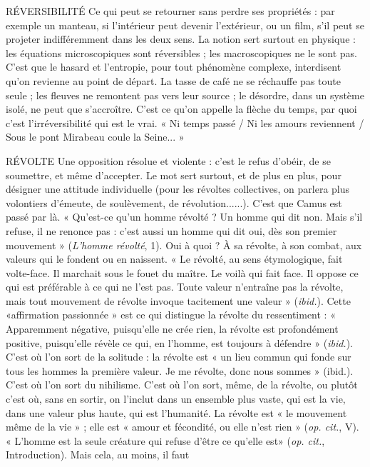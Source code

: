 RÉVERSIBILITÉ Ce qui peut se retourner sans perdre ses propriétés : par
exemple un manteau, si l’intérieur peut devenir l'extérieur,
ou un film, s’il peut se projeter indifféremment dans les deux sens. La notion sert
surtout en physique : les équations microscopiques sont réversibles ; les macroscopiques
ne le sont pas. C’est que le hasard et l’entropie, pour tout phénomène
complexe, interdisent qu’on revienne au point de départ. La tasse de café ne se
réchauffe pas toute seule ; les fleuves ne remontent pas vers leur source ; le
désordre, dans un système isolé, ne peut que s’accroître. C’est ce qu’on appelle la
flèche du temps, par quoi c’est l’irréversibilité qui est le vrai. « Ni temps passé /
Ni les amours reviennent / Sous le pont Mirabeau coule la Seine... »

RÉVOLTE Une opposition résolue et violente : c’est le refus d’obéir, de se
soumettre, et même d’accepter. Le mot sert surtout, et de plus
en plus, pour désigner une attitude individuelle (pour les révoltes collectives,
on parlera plus volontiers d’émeute, de soulèvement, de révolution......). C’est
que Camus est passé par là. « Qu'est-ce qu’un homme révolté ? Un homme qui
dit non. Mais s’il refuse, il ne renonce pas : c’est aussi un homme qui dit oui,
dès son premier mouvement » ({\it L'homme révolté}, 1). Oui à quoi ? À sa révolte, à
son combat, aux valeurs qui le fondent ou en naissent. « Le révolté, au sens étymologique,
fait volte-face. Il marchait sous le fouet du maître. Le voilà qui fait
face. Il oppose ce qui est préférable à ce qui ne l’est pas. Toute valeur n’entraîne
pas la révolte, mais tout mouvement de révolte invoque tacitement une valeur »
({\it ibid.}). Cette «affirmation passionnée » est ce qui distingue la révolte du
ressentiment : « Apparemment négative, puisqu'elle ne crée rien, la révolte est
profondément positive, puisqu'elle révèle ce qui, en l’homme, est toujours à
défendre » ({\it ibid.}). C’est où l’on sort de la solitude : la révolte est « un lieu
commun qui fonde sur tous les hommes la première valeur. Je me révolte, donc
nous sommes » (ibid.). C’est où l’on sort du nihilisme. C’est où l’on sort,
même, de la révolte, ou plutôt c’est où, sans en sortir, on l’inclut dans un
ensemble plus vaste, qui est la vie, dans une valeur plus haute, qui est l’humanité.
La révolte est « le mouvement même de la vie » ; elle est « amour et fécondité,
ou elle n’est rien » ({\it op. cit.}, V). « L'homme est la seule créature qui refuse
d’être ce qu’elle est» ({\it op. cit.}, Introduction). Mais cela, au moins, il faut
